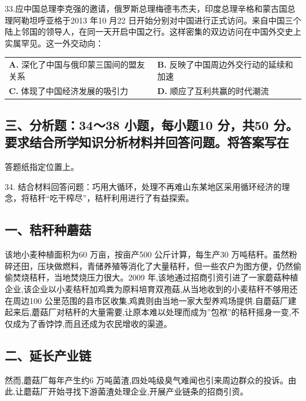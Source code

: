 \documentclass[UTF8,11pt]{ctexart}
\begin{document}
33.应中国总理李克强的邀请，俄罗斯总理梅德韦杰夫，印度总理辛格和蒙古国总理阿勒坦呼亚格于2013 年10 月22 日开始分别对中国进行正式访问。来自中国三个陆上邻国的领导人，在同一天开启中国之行。这样密集的双边访问在中国外交史上实属罕见。这一外交动向：


\begin{center}\begin{tabular}{>{\raggedright\arraybackslash}p{\dimexpr(\linewidth-4\tabcolsep)/2\relax}>{\raggedright\arraybackslash}p{\dimexpr(\linewidth-4\tabcolsep)/2\relax}}
\textbf{A.} 深化了中国与俄印蒙三国间的盟友关系 & \textbf{B.} 反映了中国周边外交行动的延续和加速\\[.35em]
\textbf{C.} 体现了中国经济发展的吸引力 & \textbf{D.} 顺应了互利共赢的时代潮流\\[.35em]\end{tabular}\end{center}

\subsection*{三、分析题：34～38 小题，每小题10 分，共50 分。要求结合所学知识分析材料并回答问题。将答案写在}

答题纸指定位置上。


34. 结合材料回答问题：巧用大循环，处理不再难山东某地区采用循环经济的理念，将秸秆“吃干榨尽”，秸秆利用进行了有益探索。


\subsection*{一、秸秆种蘑菇}

该地小麦种植面积为60 万亩，按亩产500 公斤计算，每生产30 万吨秸秆。虽然粉碎还田，压块做燃料，青储养殖等消化了大量秸秆，但一些农户为图方便，仍然偷偷焚烧秸秆，当地焚烧压力很大。2009 年,该地通过招商引资引进了一家蘑菇种植企业,该企业以小麦秸秆加鸡粪为原料培育双孢菇,从当地收到的小麦秸秆不够用还在周边100 公里范围的县市区收集,鸡粪则由当地一家大型养鸡场提供.自蘑菇厂建起来后,蘑菇厂对秸秆的大量需要,让原本难以处理而成为”包袱”的秸秆摇身一变,不仅成为了香饽饽,而且还成为农民增收的渠道。


\subsection*{二、延长产业链}

然而,蘑菇厂每年产生约6 万吨菌渣,四处吨级臭气难闻也引来周边群众的投诉。由此,让蘑菇厂开始寻找下游菌渣处理企业,开展产业链条的招商引资。
\end{document}
